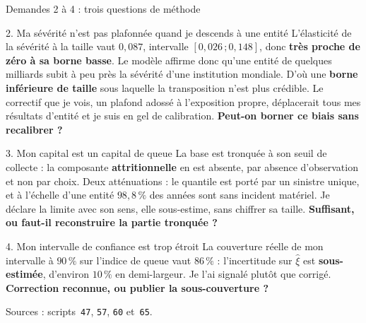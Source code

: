 \documentclass[11pt]{beamer}
\begin{document}
\begin{frame}{Demandes 2 à 4 : trois questions de méthode}
\scriptsize
\begin{block}{2. Ma sévérité n'est pas plafonnée quand je descends à une entité}
L'élasticité de la sévérité à la taille vaut $0{,}087$, intervalle $[0{,}026\,;0{,}148]$, donc
\textbf{très proche de zéro à sa borne basse}. Le modèle affirme donc qu'une entité de quelques
milliards subit à peu près la sévérité d'une institution mondiale. D'où une \textbf{borne
inférieure de taille} sous laquelle la transposition n'est plus crédible. Le correctif que je
vois, un plafond adossé à l'exposition propre, déplacerait tous mes résultats d'entité et je suis
en gel de calibration. \textbf{Peut-on borner ce biais sans recalibrer ?}
\end{block}
\vspace{-1mm}
\begin{block}{3. Mon capital est un capital de queue}
La base est tronquée à son seuil de collecte : la composante \textbf{attritionnelle} en est
absente, par absence d'observation et non par choix. Deux atténuations : le quantile est porté par
un sinistre unique, et à l'échelle d'une entité $98{,}8\,\%$ des années sont sans incident
matériel. Je déclare la limite avec son sens, elle sous-estime, sans chiffrer sa taille.
\textbf{Suffisant, ou faut-il reconstruire la partie tronquée ?}
\end{block}
\vspace{-1mm}
\begin{block}{4. Mon intervalle de confiance est trop étroit}
La couverture réelle de mon intervalle à $90\,\%$ sur l'indice de queue vaut $86\,\%$ :
l'incertitude sur $\hat\xi$ est \textbf{sous-estimée}, d'environ $10\,\%$ en demi-largeur. Je l'ai
signalé plutôt que corrigé. \textbf{Correction reconnue, ou publier la sous-couverture ?}
\end{block}
\vspace{-1mm}
{\scriptsize Sources : scripts~\texttt{47}, \texttt{57}, \texttt{60} et~\texttt{65}.}
\end{frame}
\end{document}
